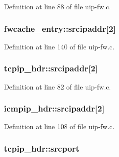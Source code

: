 Definition at line 88 of file uip-\/fw.c.

\hypertarget{group__uipfw_gaae48d38b90eb606c41fdd6cb5d56fb5c}{
\subsubsection[{srcipaddr}]{ {\bf fwcache\_\-entry::srcipaddr}\mbox{[}2\mbox{]}}}
\label{group__uipfw_gaae48d38b90eb606c41fdd6cb5d56fb5c}


Definition at line 140 of file uip-\/fw.c.

\hypertarget{group__uipfw_gae7234666e63801b5d3b76853d4f8c3da}{
\subsubsection[{srcipaddr}]{ {\bf tcpip\_\-hdr::srcipaddr}\mbox{[}2\mbox{]}}}
\label{group__uipfw_gae7234666e63801b5d3b76853d4f8c3da}


Definition at line 82 of file uip-\/fw.c.

\hypertarget{group__uipfw_ga50b8789dde802ca4ed0a4a81949d8397}{
\subsubsection[{srcipaddr}]{ {\bf icmpip\_\-hdr::srcipaddr}\mbox{[}2\mbox{]}}}
\label{group__uipfw_ga50b8789dde802ca4ed0a4a81949d8397}


Definition at line 108 of file uip-\/fw.c.

\hypertarget{group__uipfw_ga410b213756b5374d6ce2024c2e43cbf8}{
\subsubsection[{srcport}]{ {\bf tcpip\_\-hdr::srcport}}}
\label{group__uipfw_ga410b213756b5374d6ce2024c2e43cbf8}



